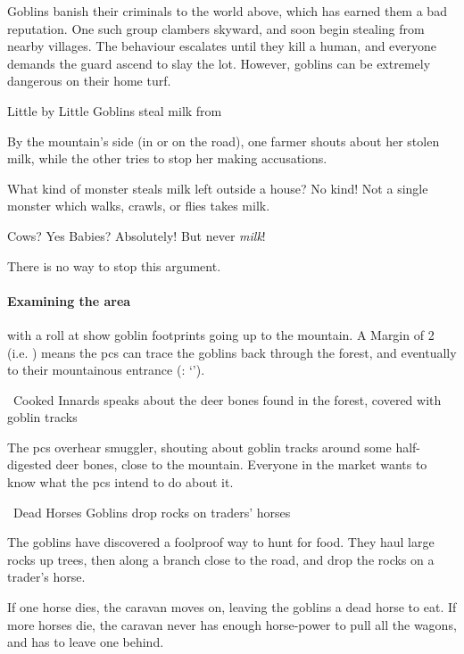 
Goblins banish their criminals to the world above, which has earned them a bad reputation.
One such group clambers skyward, and soon begin stealing from nearby \glspl{village}.
The behaviour escalates until they kill a human, and everyone demands the \gls{guard} ascend to slay the lot.
However, goblins can be extremely dangerous on their home turf.

{Little by Little}%
{Goblins steal milk from }%

By the mountain's side (in  or on the road), one farmer shouts about her stolen milk, while the other tries to stop her making accusations.

\begin{boxtext}
  What kind of monster steals milk left outside a house?
  No kind!
  Not a single \gls{monster} which walks, crawls, or flies takes milk.

  Cows?  Yes
  Babies? Absolutely!
  But never \emph{milk}!
\end{boxtext}

There is no way to stop this argument.

\paragraph{Examining the area}
with a  roll at \tn[12] show goblin footprints going up to the mountain.
A Margin of 2 (i.e. \tn[14]) means the \glspl{pc} can trace the goblins back through the forest, and eventually to their mountainous entrance (: `').

{\squash~Cooked Innards}%
{ speaks about the deer bones found in the forest, covered with goblin tracks}%

The \glspl{pc} overhear \gls{smuggler}, shouting about goblin tracks around some half-digested deer bones, close to the mountain.
Everyone in the market wants to know what the \glspl{pc} intend to do about it.

{~Dead Horses}%
{Goblins drop rocks on traders' horses}%

\begin{exampletext}
  The goblins have discovered a foolproof way to hunt for food.
  They haul large rocks up trees, then along a branch close to the road, and drop the rocks on a trader's horse.

  If one horse dies, the caravan moves on, leaving the goblins a dead horse to eat.
  If more horses die, the caravan never has enough horse-power to pull all the wagons, and has to leave one behind.
\end{exampletext}

